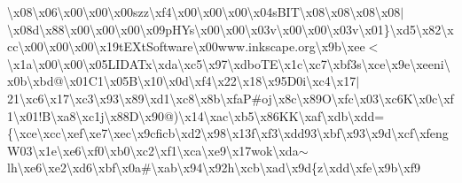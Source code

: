 \begin{DoxyCompactItemize}
\textbackslash{}x08\textbackslash{}x06\textbackslash{}x00\textbackslash{}x00\textbackslash{}x00szz\textbackslash{}xf4\textbackslash{}x00\textbackslash{}x00\textbackslash{}x00\textbackslash{}x04s\+B\+I\+T\textbackslash{}x08\textbackslash{}x08\textbackslash{}x08\textbackslash{}x08$\vert$\textbackslash{}x08d\textbackslash{}x88\textbackslash{}x00\textbackslash{}x00\textbackslash{}x00\textbackslash{}x09p\+H\+Ys\textbackslash{}x00\textbackslash{}x00\textbackslash{}x03v\textbackslash{}x00\textbackslash{}x00\textbackslash{}x03v\textbackslash{}x01\}\textbackslash{}xd5\textbackslash{}x82\textbackslash{}xcc\textbackslash{}x00\textbackslash{}x00\textbackslash{}x00\textbackslash{}x19t\+E\+Xt\+Software\textbackslash{}x00www.\+inkscape.\+org\textbackslash{}x9b\textbackslash{}xee$<$\textbackslash{}x1a\textbackslash{}x00\textbackslash{}x00\textbackslash{}x05\+L\+I\+D\+A\+Tx\textbackslash{}xda\textbackslash{}xc5\textbackslash{}x97\textbackslash{}xdbo\+T\+E\textbackslash{}x1c\textbackslash{}xc7\textbackslash{}xbf3s\textbackslash{}xce\textbackslash{}x9e\textbackslash{}xeeni\textbackslash{}x0b\textbackslash{}xbd@\textbackslash{}x01\+C1\textbackslash{}x05\+B\textbackslash{}x10\textbackslash{}x0d\textbackslash{}xf4\textbackslash{}x22\textbackslash{}x18\textbackslash{}x95\+D0i\textbackslash{}xc4\textbackslash{}x17$\vert$21\textbackslash{}xc6\textbackslash{}x17\textbackslash{}xc3\textbackslash{}x93\textbackslash{}x89\textbackslash{}xd1\textbackslash{}xc8\textbackslash{}x8b\textbackslash{}xfa\+P\#oj\textbackslash{}x8c\textbackslash{}x89\+O\textbackslash{}xfc\textbackslash{}x03\textbackslash{}xc6\+K\textbackslash{}x0c\textbackslash{}xf1\textbackslash{}x01!\+B\textbackslash{}xa8\textbackslash{}xc1j\textbackslash{}x88\+D\textbackslash{}x90@)\textbackslash{}x14\textbackslash{}xac\textbackslash{}xb5\textbackslash{}x86\+K\+K\textbackslash{}xaf\textbackslash{}xdb\textbackslash{}xdd=\{\textbackslash{}xce\textbackslash{}xcc\textbackslash{}xef\textbackslash{}xe7\textbackslash{}xec\textbackslash{}x9cficb\textbackslash{}xd2\textbackslash{}x98\textbackslash{}x13f\textbackslash{}xf3\textbackslash{}xdd93\textbackslash{}xbf\textbackslash{}x93\textbackslash{}x9d\textbackslash{}xcf\textbackslash{}xfeng\+W03\textbackslash{}x1e\textbackslash{}xe6\textbackslash{}xf0\textbackslash{}xb0\textbackslash{}xc2\textbackslash{}xf1\textbackslash{}xca\textbackslash{}xe9\textbackslash{}x17wok\textbackslash{}xda$\sim$lh\textbackslash{}xe6\textbackslash{}xe2\textbackslash{}xd6\textbackslash{}xbf\textbackslash{}x0a\#\textbackslash{}xab\textbackslash{}x94\textbackslash{}x92h\textbackslash{}xcb\textbackslash{}xad\textbackslash{}x9d\{z\textbackslash{}xdd\textbackslash{}xfe\textbackslash{}x9b\textbackslash{}xf9 
\end{DoxyCompactItemize}
